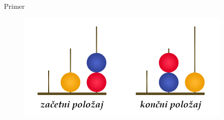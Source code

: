 \documentclass[dvipsnames]{beamer}
\DeclareMathOperator {\stopnja} {deg}
\begin{document}
%

\begin{frame}{Primer}
    \begin{figure}
        \centering
        \includegraphics[height=150pt]{../img/london-tower.png}
    \end{figure}
\end{frame}
\end{document}
